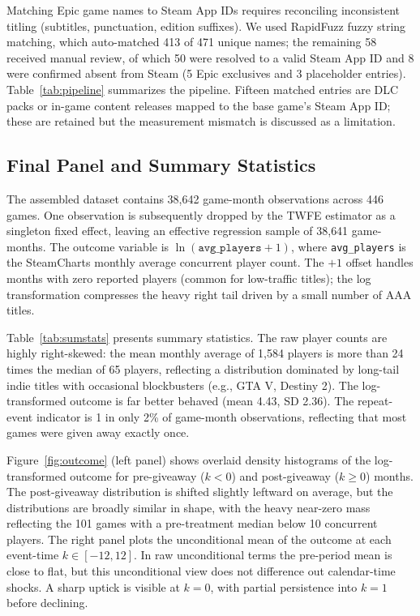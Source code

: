 \documentclass[11pt]{article}
\begin{document}
Matching Epic game names to Steam App IDs requires reconciling inconsistent titling
(subtitles, punctuation, edition suffixes). We used RapidFuzz fuzzy string matching, 
which auto-matched 413 of 471 unique names; the remaining 58
received manual review, of which 50 were resolved to a valid Steam App ID and 8 were
confirmed absent from Steam (5 Epic exclusives and 3 placeholder entries).
Table~\ref{tab:pipeline} summarizes the pipeline. Fifteen matched entries are DLC packs
or in-game content releases mapped to the base game's Steam App ID; these are retained
but the measurement mismatch is discussed as a limitation.

\subsection{Final Panel and Summary Statistics}

The assembled dataset contains 38{,}642 game-month observations across 446 games.
One observation is subsequently dropped by the TWFE estimator as a singleton fixed
effect, leaving an effective regression sample of 38{,}641 game-months.
The outcome variable is $\ln(\texttt{avg\_players}+1)$, where \texttt{avg\_players}
is the SteamCharts monthly average concurrent player count. The $+1$ offset handles
months with zero reported players (common for low-traffic titles); the log transformation
compresses the heavy right tail driven by a small number of AAA titles.

Table~\ref{tab:sumstats} presents summary statistics. The raw player counts are highly
right-skewed: the mean monthly average of 1{,}584 players is more than 24 times the
median of 65 players, reflecting a distribution dominated by long-tail indie titles
with occasional blockbusters (e.g., GTA V, Destiny 2). The log-transformed outcome is
far better behaved (mean 4.43, SD 2.36). The repeat-event indicator is 1 in only 2\%
of game-month observations, reflecting that most games were given away exactly once.

Figure~\ref{fig:outcome} (left panel) shows overlaid density histograms of the
log-transformed outcome for pre-giveaway ($k < 0$) and post-giveaway ($k \geq 0$)
months. The post-giveaway distribution is shifted slightly leftward on average, but
the distributions are broadly similar in shape, with the heavy near-zero mass
reflecting the 101 games with a pre-treatment median below 10 concurrent players.
The right panel plots the unconditional mean of the outcome at each event-time
$k \in [-12, 12]$. In raw unconditional terms the pre-period mean is close to flat,
but this unconditional view does not difference out calendar-time shocks. A sharp uptick
is visible at $k = 0$, with partial persistence into $k = 1$ before declining.
\end{document}
